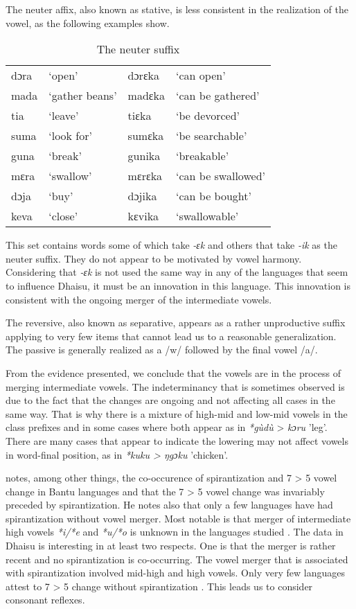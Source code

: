 \documentclass[output=paper,colorlinks,citecolor=brown]{langscibook}
\begin{document}
The neuter affix, also known as stative, is less consistent in the realization of the vowel, as the following examples show.

\begin{table}
    \caption{The neuter suffix}
    \label{tab:ngonyani:16}
    \begin{tabular}{@{}l l l l@{}}
        dɔra & `open' & dɔrɛka & `can open'  \\
         mada & `gather beans' & madɛka & `can be gathered'\\
         tia & `leave' & tiɛka & `be devorced'\\
         suma & `look for' & sumɛka & `be searchable'\\
         guna & `break' & gunika & `breakable'\\
         mɛra & `swallow' & mɛrɛka & `can be swallowed'\\
         dɔja & `buy' & dɔjika & `can be bought'\\
         keva & `close' & kɛvika & `swallowable'
    \end{tabular}
\end{table}

This set contains words some of which take \textit{-ɛk }and others that take \textit{-ik} as the neuter suffix. They do not appear to be motivated by vowel harmony. Considering that \textit{-ɛk} is not used the same way in any of the languages that seem to influence Dhaisu, it must be an innovation in this language. This innovation is consistent with the ongoing merger of the intermediate vowels.

The reversive, also known as separative, appears as a rather unproductive suffix applying to very few items that cannot lead us to a reasonable generalization. The passive is generally realized as a /w/ followed by the final vowel /a/.

From the evidence presented, we conclude that the vowels are in the process of merging intermediate vowels. The indeterminancy that is sometimes observed is due to the fact that the changes are ongoing and not affecting all cases in the same way. That is why there is a mixture of high-mid and low-mid vowels in the class prefixes and in some cases where both appear as in \textit{*gùdù} > \textit{kɔru} 'leg'. There are many cases that appear to indicate the lowering may not affect vowels in word-final position, as in \textit{*kuku >  ŋgɔku} 'chicken'.

\cite{Schadeberg1995} notes, among other things, the co-occurence of spirantization and 7 > 5 vowel change in Bantu languages and that the 7 > 5 vowel change was invariably preceded by spirantization. He notes also that only a few languages have had spirantization without vowel merger. Most notable is that merger of intermediate high vowels \textit{*i/*e} and \textit{*u/*o} is unknown in the languages studied \citep{Schadeberg1995}. The data in Dhaisu is interesting in at least two respects. One is that the merger is rather recent and no spirantization is co-occurring. The vowel merger that is associated with spirantization involved mid-high and high vowels. Only very few languages attest to 7 > 5 change without spirantization \citep{Bostoen2008}. This leads us to consider consonant reflexes.
\end{document}
